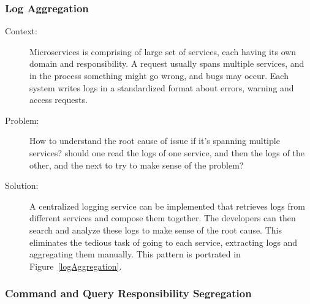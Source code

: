 \documentclass{bmcart}
\begin{document}

\subsubsection{Log Aggregation}

\begin{description}
  \item[Context:] Microservices is comprising of large set of services, each having its own domain and responsibility. A request usually spans multiple services, and in the process something might go wrong, and bugs may occur. Each system writes logs in a standardized format about errors, warning and access requests. 
  \item[Problem:] How to understand the root cause of issue if it's spanning multiple services? should one read the logs of one service, and then the logs of the other, and the next to try to make sense of the problem?  
  \item[Solution:] A centralized logging service can be implemented that retrieves logs from different services and compose them together. The developers can then search and analyze these logs to make sense of the root cause. This eliminates the tedious task of going to each service, extracting logs and aggregating them manually. This pattern is portrated in Figure~\ref{logAggregation}.    
\end{description}



\subsubsection{Command and Query Responsibility Segregation}
\end{document}
